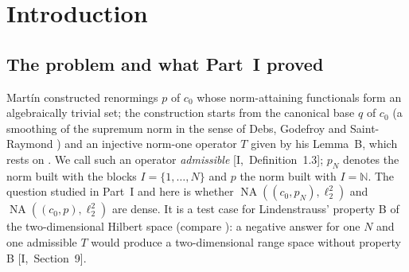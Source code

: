 \documentclass[10pt]{amsart}
\theoremstyle{definition}
\theoremstyle{remark}
\newcommand{\NA}{\operatorname{NA}}
\newcommand{\N}{\mathbb N}
\begin{document}
\section{Introduction}\label{sec:II-intro}

\subsection{The problem and what Part~I proved}
Mart\'in \cite{Martin} constructed renormings $p$ of $c_0$ whose
norm-attaining functionals form an algebraically trivial set; the
construction starts from the canonical base $q$ of $c_0$ (a smoothing of
the supremum norm in the sense of Debs, Godefroy and Saint-Raymond
\cite{DGS}) and an injective norm-one operator $T$ given by his Lemma~B,
which rests on \cite[Proposition~2.8]{KLMW20}.  We call such an operator
\emph{admissible} [I,~Definition~1.3]; $p_N$ denotes the norm built with
the blocks $I=\{1,\dots,N\}$ and $p$ the norm built with $I=\N$.  The
question studied in Part~I \cite{PartI} and here is whether
$\NA((c_0,p_N),\ell_2^2)$ and $\NA((c_0,p),\ell_2^2)$ are dense.  It is a
test case for Lindenstrauss' property B \cite{Lindenstrauss} of the
two-dimensional Hilbert space (compare \cite{JW,KLMW}): a negative answer
for one $N$ and one admissible $T$ would produce a two-dimensional range
space without property B [I,~Section~9].
\end{document}
